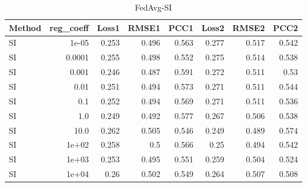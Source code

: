\begin{table}
\caption{FedAvg-SI}
\begin{tabular}{lrrrrrrr}
\toprule
Method & reg_coeff & Loss1 & RMSE1 & PCC1 & Loss2 & RMSE2 & PCC2 \\
\midrule
SI & 1e-05 & 0.253 & 0.496 & 0.563 & 0.277 & 0.517 & 0.542 \\
SI & 0.0001 & 0.255 & 0.498 & 0.552 & 0.275 & 0.514 & 0.538 \\
SI & 0.001 & 0.246 & 0.487 & 0.591 & 0.272 & 0.511 & 0.53 \\
SI & 0.01 & 0.251 & 0.494 & 0.573 & 0.271 & 0.511 & 0.544 \\
SI & 0.1 & 0.252 & 0.494 & 0.569 & 0.271 & 0.511 & 0.536 \\
SI & 1.0 & 0.249 & 0.492 & 0.577 & 0.267 & 0.506 & 0.538 \\
SI & 10.0 & 0.262 & 0.505 & 0.546 & 0.249 & 0.489 & 0.574 \\
SI & 1e+02 & 0.258 & 0.5 & 0.566 & 0.25 & 0.494 & 0.542 \\
SI & 1e+03 & 0.253 & 0.495 & 0.551 & 0.259 & 0.504 & 0.524 \\
SI & 1e+04 & 0.26 & 0.502 & 0.549 & 0.264 & 0.507 & 0.508 \\
\bottomrule
\end{tabular}
\end{table}
